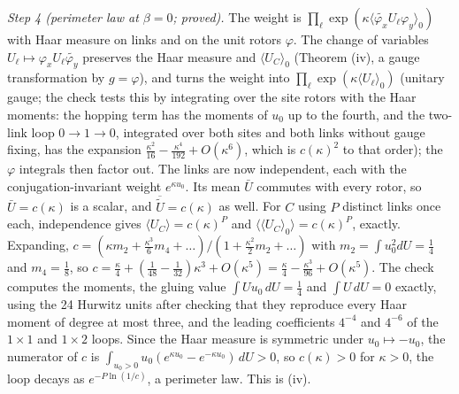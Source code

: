 \emph{Step 4 (perimeter law at $\beta = 0$; proved).} The weight is $\prod_{\ell}\exp(\kappa\langle\widetilde{\varphi_{x}}U_{\ell}\varphi_{y}\rangle_{0})$ with Haar measure on links and on the unit rotors $\varphi$. The change of variables $U_{\ell} \mapsto \varphi_{x}U_{\ell}\widetilde{\varphi_{y}}$ preserves the Haar measure and $\langle U_{C}\rangle_{0}$ (Theorem (iv), a gauge transformation by $g = \varphi$), and turns the weight into $\prod_{\ell}\exp(\kappa\langle U_{\ell}\rangle_{0})$ (unitary gauge; the check tests this by integrating over the site rotors with the Haar moments: the hopping term has the moments of $u_{0}$ up to the fourth, and the two-link loop $0 \to 1 \to 0$, integrated over both sites and both links without gauge fixing, has the expansion $\tfrac{\kappa^{2}}{16} - \tfrac{\kappa^{4}}{192} + O(\kappa^{6})$, which is $c(\kappa)^{2}$ to that order); the $\varphi$ integrals then factor out. The links are now independent, each with the conjugation-invariant weight $e^{\kappa u_{0}}$. Its mean $\bar U$ commutes with every rotor, so $\bar U = c(\kappa)$ is a scalar, and $\overline{\widetilde U} = c(\kappa)$ as well. For $C$ using $P$ distinct links once each, independence gives $\langle U_{C}\rangle = c(\kappa)^{P}$ and $\langle\langle U_{C}\rangle_{0}\rangle = c(\kappa)^{P}$, exactly. Expanding, $c = (\kappa m_{2} + \tfrac{\kappa^{3}}{6}m_{4} + \dots)/(1 + \tfrac{\kappa^{2}}{2}m_{2} + \dots)$ with $m_{2} = \int u_{0}^{2}dU = \tfrac14$ and $m_{4} = \tfrac18$, so $c = \tfrac{\kappa}{4} + (\tfrac{1}{48} - \tfrac{1}{32})\kappa^{3} + O(\kappa^{5}) = \tfrac{\kappa}{4} - \tfrac{\kappa^{3}}{96} + O(\kappa^{5})$. The check computes the moments, the gluing value $\int U u_{0}\,dU = \tfrac14$ and $\int U\,dU = 0$ exactly, using the 24 Hurwitz units after checking that they reproduce every Haar moment of degree at most three, and the leading coefficients $4^{-4}$ and $4^{-6}$ of the $1 \times 1$ and $1 \times 2$ loops. Since the Haar measure is symmetric under $u_{0} \mapsto -u_{0}$, the numerator of $c$ is $\int_{u_{0} > 0}u_{0}(e^{\kappa u_{0}} - e^{-\kappa u_{0}})\,dU > 0$, so $c(\kappa) > 0$ for $\kappa > 0$, the loop decays as $e^{-P\ln(1/c)}$, a perimeter law. This is (iv).


